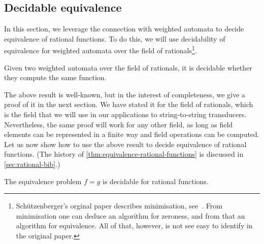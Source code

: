 \subsection{Decidable equivalence}
\label{sec:decidable-equivalence-rational-functions}

In this section, we leverage the connection with weighted automata to decide equivalence of rational functions. To do this, we will use decidability of equivalence for weighted automata over the  field of rationals\footnote{Sch\"utzenberger's orginal paper describes minimisation, see~\cite[Section B]{Schutzenberger1961OnTheDefinition}. From minimisation one can deduce an algorithm for zeroness, and from that an algorithm for equivalence. All of that, however, is not see easy to identify in the original paper.}.
\begin{theorem}\label{thm:equivalence-weighted-automata}
    Given two weighted automata over the field of rationals, it is decidable whether they compute the same function.    
\end{theorem}

The above result is well-known, but in the interest of completeness, we give a proof of it in the next section.  We have stated it for the field of rationals, which is the field that we will use in our applications to string-to-string transducers. Nevertheless, the same proof will work  for any other field, as long as field elements can be represented in a finite way and field operations can be computed. Let us now show how to use the above result to decide equivalence of rational functions. (The history of \cref{thm:equivalence-rational-functions} is discussed in \cref{sec:rational-bib}.)
\begin{theorem}\label{thm:equivalence-rational-functions}
    The equivalence problem $f=g$ is decidable for rational functions.
\end{theorem}

